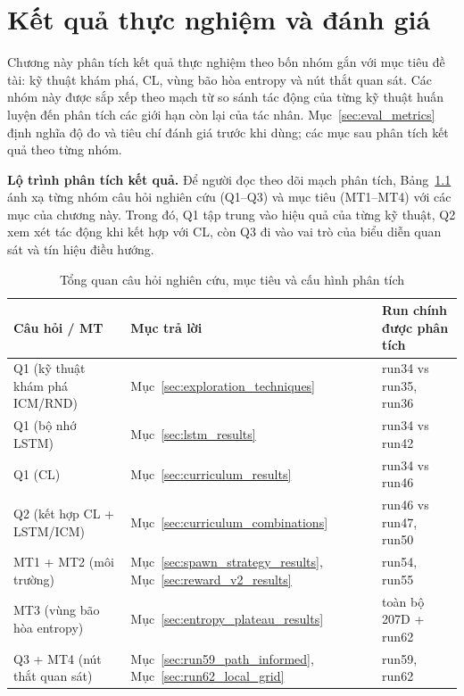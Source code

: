 \clearpage
{}

\setcounter{chapter}{3}
\chapter[{KẾT QUẢ THỰC NGHIỆM VÀ ĐÁNH GIÁ}]{Kết quả thực nghiệm và đánh giá}

Chương này phân tích kết quả thực nghiệm theo bốn nhóm gắn với mục tiêu đề tài: kỹ thuật khám phá, CL, vùng bão hòa entropy và nút thắt quan sát. Các nhóm này được sắp xếp theo mạch từ so sánh tác động của từng kỹ thuật huấn luyện đến phân tích các giới hạn còn lại của tác nhân. Mục~\ref{sec:eval_metrics} định nghĩa độ đo và tiêu chí đánh giá trước khi dùng; các mục sau phân tích kết quả theo từng nhóm.

\textbf{Lộ trình phân tích kết quả.} Để người đọc theo dõi mạch phân tích, Bảng~\ref{tab:results_storyline} ánh xạ từng nhóm câu hỏi nghiên cứu (Q1--Q3) và mục tiêu (MT1--MT4) với các mục của chương này. Trong đó, Q1 tập trung vào hiệu quả của từng kỹ thuật, Q2 xem xét tác động khi kết hợp với CL, còn Q3 đi vào vai trò của biểu diễn quan sát và tín hiệu điều hướng.

\begin{table}[H]
    \centering
    \small
    \caption{Tổng quan câu hỏi nghiên cứu, mục tiêu và cấu hình phân tích}
    \label{tab:results_storyline}
    \begin{tabular}{|p{4cm}|p{4cm}|p{5cm}|}
        \hline
        \textbf{Câu hỏi / MT} & \textbf{Mục trả lời} & \textbf{Run chính được phân tích} \\
        \hline
        Q1 (kỹ thuật khám phá ICM/RND) & Mục~\ref{sec:exploration_techniques} & run34 vs run35, run36 \\
        \hline
        Q1 (bộ nhớ LSTM) & Mục~\ref{sec:lstm_results} & run34 vs run42 \\
        \hline
        Q1 (CL) & Mục~\ref{sec:curriculum_results} & run34 vs run46 \\
        \hline
        Q2 (kết hợp CL + LSTM/ICM) & Mục~\ref{sec:curriculum_combinations} & run46 vs run47, run50 \\
        \hline
        MT1 + MT2 (môi trường) & Mục~\ref{sec:spawn_strategy_results}, Mục~\ref{sec:reward_v2_results} & run54, run55 \\
        \hline
        MT3 (vùng bão hòa entropy) & Mục~\ref{sec:entropy_plateau_results} & toàn bộ 207D + run62 \\
        \hline
        Q3 + MT4 (nút thắt quan sát) & Mục~\ref{sec:run59_path_informed}, Mục~\ref{sec:run62_local_grid} & run59, run62 \\
        \hline
    \end{tabular}
\end{table}

